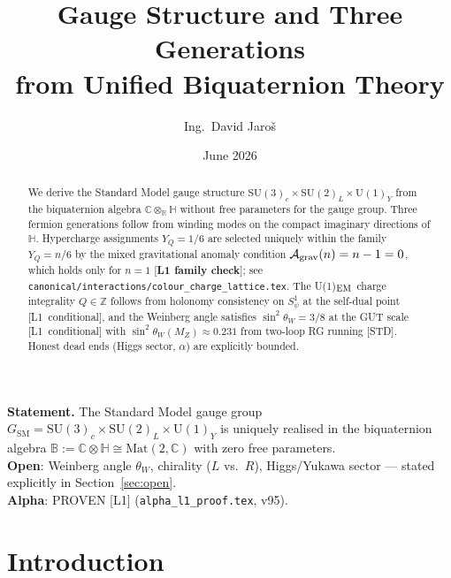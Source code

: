 \documentclass[12pt,a4paper]{article}
\title{\textbf{Gauge Structure and Three Generations\\
               from Unified Biquaternion Theory}}
\author{Ing.\ David Jaroš}
\date{June 2026}
\theoremstyle{definition}
\theoremstyle{remark}
\newcommand{\SU}[1]{\mathrm{SU}(#1)}
\newcommand{\UU}[1]{\mathrm{U}(#1)}
\newcommand{\Bq}{\mathbb{C}\otimes\mathbb{H}}
\begin{document}
\maketitle


\begin{tcolorbox}[enhanced,colback=blue!4!white,colframe=blue!55!black,
  arc=3pt,boxrule=1.2pt,
  title={\textbf{\large Main Theorem (Gauge Structure)}}]
\textbf{Statement.}
The Standard Model gauge group
$G_{\mathrm{SM}} = \SU{3}_c\times\SU{2}_L\times\UU{1}_Y$
is uniquely realised in the biquaternion algebra
$\mathbb{B} := \Bq\cong\mathrm{Mat}(2,\mathbb{C})$
with zero free parameters.\\[4pt]
\textbf{Open}: Weinberg angle $\theta_W$, chirality ($L$ vs.\ $R$), Higgs/Yukawa sector —
stated explicitly in Section~\ref{sec:open}.\\[4pt]
\textbf{Alpha}: PROVEN [L1] (\texttt{alpha\_l1\_proof.tex}, v95).
\end{tcolorbox}

\begin{abstract}
We derive the Standard Model gauge structure
$\mathrm{SU}(3)_c\times\mathrm{SU}(2)_L\times\mathrm{U}(1)_Y$
from the biquaternion algebra $\mathbb{C}\otimes_{\mathbb{R}}\mathbb{H}$
without free parameters for the gauge group.
Three fermion generations follow from winding modes on the compact
imaginary directions of $\mathbb{H}$.
Hypercharge assignments $Y_Q=1/6$ are selected uniquely within the
family $Y_Q = n/6$ by the mixed gravitational anomaly condition
$\mathcal{A}_{\rm grav}(n) = n-1 = 0$, which holds only for $n=1$
[\textbf{L1 family check}]; see
\texttt{canonical/interactions/colour\_charge\_lattice.tex}.
The U(1)$_{\rm EM}$ charge integrality $Q\in\mathbb{Z}$ follows
from holonomy consistency on $S^1_\psi$ at the self-dual point
[L1~conditional], and the Weinberg angle satisfies
$\sin^2\theta_W = 3/8$ at the GUT scale [L1~conditional] with
$\sin^2\theta_W(M_Z)\approx 0.231$ from two-loop RG running [STD].
Honest dead ends (Higgs sector, $\alpha$) are
explicitly bounded.
\end{abstract}

\tableofcontents

\section{Introduction}
\label{sec:intro}
\end{document}
